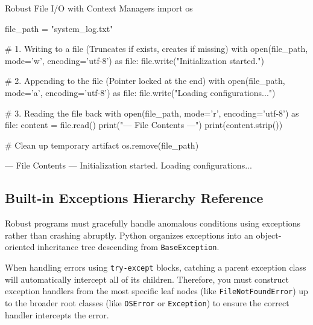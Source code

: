 \begin{pythoncode}[]{Robust File I/O with Context Managers}
import os

file_path = "system_log.txt"

# 1. Writing to a file (Truncates if exists, creates if missing)
with open(file_path, mode='w', encoding='utf-8') as file:
    file.write("Initialization started.\n")

# 2. Appending to the file (Pointer locked at the end)
with open(file_path, mode='a', encoding='utf-8') as file:
    file.write("Loading configurations...\n")

# 3. Reading the file back
with open(file_path, mode='r', encoding='utf-8') as file:
    content = file.read()
    print("--- File Contents ---")
    print(content.strip())
    
# Clean up temporary artifact
os.remove(file_path)
\end{pythoncode}
\begin{outputbox}
--- File Contents ---
Initialization started.
Loading configurations...
\end{outputbox}

\subsection{Built-in Exceptions Hierarchy Reference}

Robust programs must gracefully handle anomalous conditions using exceptions rather than crashing abruptly. Python organizes exceptions into an object-oriented inheritance tree descending from \texttt{BaseException}. 

When handling errors using \texttt{try-except} blocks, catching a parent exception class will automatically intercept all of its children. Therefore, you must construct exception handlers from the most specific leaf nodes (like \texttt{FileNotFoundError}) up to the broader root classes (like \texttt{OSError} or \texttt{Exception}) to ensure the correct handler intercepts the error. \examBadge


